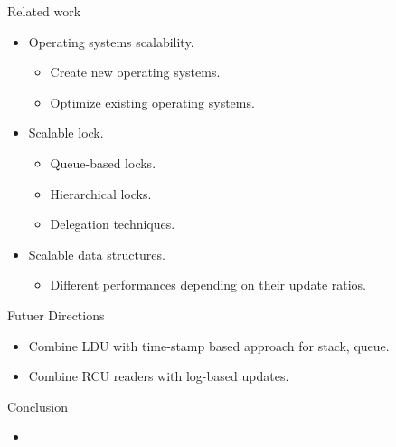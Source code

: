 \documentclass[english]{beamer} %
\begin{document}
\begin{frame}{Related work}
\begin{itemize}
    \item Operating systems scalability.
    \begin{itemize}
    \item Create new operating systems.
    \item Optimize existing operating systems.
    \end{itemize}    
    \item Scalable lock.
    \begin{itemize}
    \item Queue-based locks.
    \item Hierarchical locks.
    \item Delegation techniques.
    \end{itemize}
    \item Scalable data structures.
    \begin{itemize}
    \item Different performances depending on their update ratios.
    \end{itemize}
    \end{itemize}
\end{frame}





\begin{frame}{Futuer Directions}
	\begin{itemize} 
	\item Combine LDU with time-stamp based approach for stack, queue.
	\item Combine RCU readers with log-based updates.
	\end{itemize}
\end{frame}



\begin{frame}{Conclusion}
    \begin{itemize}
    \item {}
    \end{itemize}
\end{frame}
\end{document}
